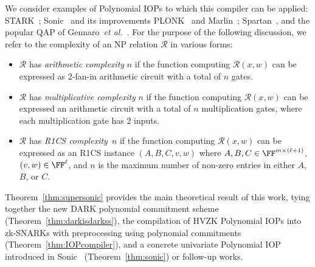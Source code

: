 We consider examples of Polynomial IOPs to which this compiler can be applied: \textsf{STARK}~\cite{C:BBHR19}; \textsf{Sonic}~\cite{Sonic} and its improvements \textsf{PLONK}~\cite{Plonk} and \textsf{Marlin}~\cite{Marlin}; \textsf{Spartan}~\cite{Spartan}, and the popular QAP of Gennaro~\emph{et al.}~\cite{EC:GGPR13}. 
For the purpose of the following discussion, we refer to the complexity of an NP relation $\mathcal{R}$ in various forms: 
\begin{itemize}
\item $\mathcal{R}$ has \emph{arithmetic complexity} $n$ if the function computing $\mathcal{R}(x, w)$ can be expressed as 2-fan-in arithmetic circuit with a total of $n$ gates. 
\item $\mathcal{R}$ has \emph{multiplicative complexity} $n$ if the function computing $\mathcal{R}(x, w)$ can be expressed an arithmetic circuit with a total of $n$ multiplication gates, where each multiplication gate has 2 inputs.
\item $\mathcal{R}$ has \emph{R1CS complexity}\footnotemark \ $n$ if the function computing $\mathcal{R}(x, w)$ can be expressed as an R1CS instance $(A, B, C, v, w)$ where $A, B, C \in \FF^{m \times (\ell+1)}$, $(v,w) \in \FF^\ell$, and $n$ is the maximum number of non-zero entries in either $A$, $B$, or $C$. 
\end{itemize}

Theorem~\ref{thm:supersonic} provides the main theoretical result of this work, tying together the new DARK polynomial commitment scheme (Theorem~\ref{thm:darkisdarkss}), the compilation of HVZK Polynomial IOPs into zk-SNARKs with preprocessing using polynomial commitments (Theorem~\ref{thm:IOPcompiler}), and a concrete univariate Polynomial IOP introduced in \textsf{Sonic}~\cite{Sonic} (Theorem~\ref{thm:sonic}) or follow-up works.   
 
